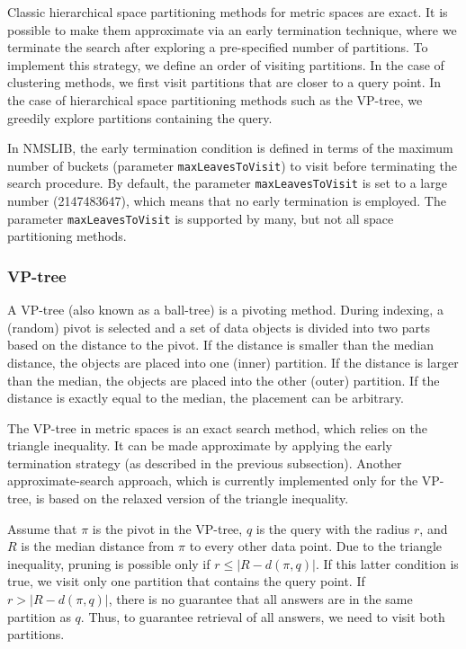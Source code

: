 \documentclass[runningheads,a4paper]{llncs}
\newcommand{\ttt}[1]{\texttt{#1}}
\begin{document}
{Classic hierarchical space partitioning methods for metric spaces are exact. 
It is possible to make them approximate via an early termination technique,
where we terminate the search after exploring a pre-specified number of partitions.
To implement this strategy, we define an order of visiting partitions.
In the case of clustering methods, we first visit partitions that are closer to a query point.
In the case of hierarchical space partitioning methods such as the VP-tree,
we greedily explore partitions containing the query.

In NMSLIB, the early termination condition is defined in terms of 
the maximum number of buckets (parameter \ttt{maxLeavesToVisit})
to visit before terminating the search procedure.
By default, the parameter \ttt{maxLeavesToVisit} is set to a large number (2147483647), 
which means that no early termination is employed.
The parameter \ttt{maxLeavesToVisit} is supported by many, but not all
space partitioning methods.

\subsubsection{VP-tree}\label{SectionVPtree}
A VP-tree \cite{Uhlmann:1991,Yianilos:1993} (also known as a ball-tree)
is a pivoting method.
During indexing, a (random) pivot is selected and a set of data objects is divided into
two parts based on the distance to the pivot.
If the distance is smaller than the median distance, the objects are placed into
one (inner) partition. If the distance is larger than the median,
the objects are placed into the other (outer) partition.
If the distance is exactly equal to the median, the placement can be arbitrary.

The VP-tree in metric spaces is an exact search method, which relies on the triangle inequality.
It can be made approximate by applying the early termination strategy (as described 
in the previous subsection).
Another approximate-search approach, 
which is currently implemented only for the VP-tree, 
is based on the relaxed version of the triangle inequality.

Assume that $\pi$ is the pivot in the VP-tree, $q$ is the query with the radius $r$, 
and $R$ is the median distance from $\pi$ to every other data point.
Due to the triangle inequality, pruning is possible only if $r \le |R - d(\pi, q)|$. 
If this latter condition is true, 
we visit only one partition that contains the query point.
If $r > |R - d(\pi, q)|$, there is no guarantee that all answers
are in the same partition as $q$. Thus, to guarantee retrieval of all answers,
we need to visit both partitions.

}
\end{document}
